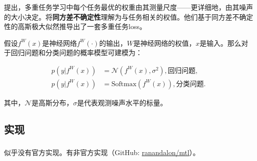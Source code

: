 \documentclass[a4paper,punct]{ctexart}
\begin{document}
\subsubsection{}

\citet{Kendall18Uncertainty}提出，多重任务学习中每个任务最优的权重由其测量尺度——更详细地，由其噪声的大小决定。\citet{Kendall18Uncertainty}将\textbf{同方差不确定性}理解为与任务相关的权值。他们基于同方差不确定性的高斯极大似然推导出了一套多重任务loss。

假设$f^W(x)$是神经网络$f^W(\cdot)$的输出，$W$是神经网络的权值，$x$是输入。那么对于回归问题和分类问题的概率模型可建模为：

\begin{equation}
    \begin{aligned}
        p(y|f^W(x)) &= \mathcal{N}(f^W(x), \sigma^2),\textrm{回归问题},\\
        p(y|f^W(x)) &= \mathrm{Softmax}(f^W(x)),\textrm{分类问题}.
    \end{aligned}
\end{equation}

其中，$\mathcal{N}$是高斯分布，$\sigma$是代表观测噪声水平的标量。


\subsection{实现}

\subsubsection{}

似乎没有官方实现。有非官方实现（GitHub: \href{https://github.com/ranandalon/mtl}{ranandalon/mtl}）。




\end{document}
